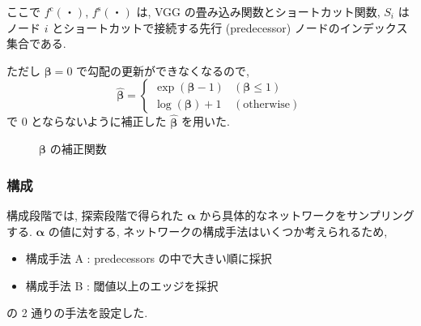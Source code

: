 ここで $f^{\mathrm{c}}(・)$, $f^{\mathrm{s}}(・)$ は, VGG の畳み込み関数とショートカット関数,
$S_i$ はノード $i$ とショートカットで接続する先行 (predecessor) ノードのインデックス集合である.

ただし $\bm{\beta}=0$ で勾配の更新ができなくなるので,
\begin{equation}
  \label{equ:beta}
  \hat{\bm{\beta}} = \begin{cases}
    \exp(\bm{\beta} - 1) & (\bm{\beta} \leq 1) \\
    \log(\bm{\beta}) + 1 & (\mathrm{otherwise})
  \end{cases}
\end{equation}
で 0 とならないように補正した $\hat{\bm{\beta}}$ を用いた.

\begin{figure}[t]
  \begin{center}
  \end{center}
  \caption{$\bm{\beta}$ の補正関数}
  \label{fig:pred/beta}
\end{figure}




\subsubsection{構成}

構成段階では, 探索段階で得られた $\bm{\alpha}$ から具体的なネットワークをサンプリングする.
$\bm{\alpha}$ の値に対する, ネットワークの構成手法はいくつか考えられるため,
\begin{itemize}
  \item 構成手法 A : predecessors の中で大きい順に採択
  \item 構成手法 B : 閾値以上のエッジを採択
\end{itemize}
の 2 通りの手法を設定した.

